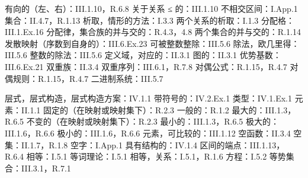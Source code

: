 有向的（左、右）：III.1.10，R.6.8 关于关系 ≤ 的：III.1.10 不相交区间：I.App.1 集合：II.4.7，R.1.13 析取，情形的方法：I.3.3 两个关系的析取：I.1.3 分配格：III.1.Ex.16 分配律，集合族的并与交的：R.4.3，4.8 两个集合的并与交的：R.1.14 发散映射（序数到自身的）：III.6.Ex.23 可被整数整除：III.5.6 除法，欧几里得：III.5.6 整数的除法：III.5.6 定义域，对应的：II.3.1 图的：II.3.1 优势基数：III.6.Ex.21 双重族：II.3.4 双重序列：III.6.1，R.7.8 对偶公式：R.1.15，R.4.7 对偶规则：R.1.15，R.4.7 二进制系统：III.5.7

层式，层式构造，层式构造方案：IV.1.1 带符号的：IV.2.Ex.1 类型：IV.1.Ex.1 元素：II.1.1 固定的（在映射或映射集下）：R.2.3 一般的：R.1.2 最大的：III.1.3，R.6.5 不变的（在映射或映射集下）：R.2.3 最小的：III.1.3，R.6.5 极大的：III.1.6，R.6.6 极小的：III.1.6，R.6.6 元素，可比较的：III.1.12 空函数：II.3.4 空集：II.1.7，R.1.8 空字：I.App.1 具有结构的：IV.1.4 区间的端点：III.1.13，R.6.4 相等：I.5.1 等词理论：I.5.1 相等，关系：I.5.1，R.1.6 方程：I.5.2 等势集合：III.3.1，R.7.1

\begin{Shaded}
\begin{Highlighting}[]

\end{Highlighting}
\end{Shaded}

